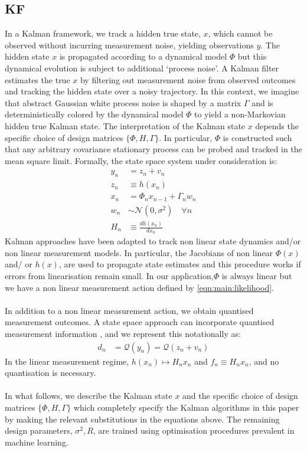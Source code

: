 \subsection{KF}
In a Kalman framework, we track a hidden true state, $x$, which cannot be observed without incurring measurement noise, yielding observations $y$. The hidden state $x$ is propagated according to a dynamical model $\Phi$ but this dynamical evolution is subject to additional `process noise'. A Kalman filter estimates the true $x$ by filtering out measurement noise from observed outcomes and tracking the hidden state over a noisy trajectory. In this context, we imagine that abstract Gaussian white process noise is shaped by  a matrix $\Gamma$ and is deterministically colored by the dynamical model $\Phi$ to yield a non-Markovian hidden true Kalman state. The interpretation of the Kalman state $x$ depends the specific choice of design matrices $\{ \Phi, H, \Gamma\}$. In particular, $\Phi$ is constructed such that any arbitrary covariance stationary process can be probed and tracked in the mean square limit. Formally, the state space system under consideration is:
\begin{align}
y_n &= z_n + v_n \\
z_n & \equiv  h(x_n) \\
x_n & = \Phi_n x_{n-1} + \Gamma_n w_n \label{eqn:KF:dynamics} \\
w_n & \sim \mathcal{N}(0, \sigma^2) \quad \forall n \\
H_n &\equiv \frac{d h(x_n)}{dx_n}  
\end{align}
Kalman approaches have been adapted to track non linear state dynamics and/or non linear measurement models. In particular, the Jacobians of non linear $ \Phi(x)$ and/ or $h(x)$, are used to propagate state estimates and this procedure works if errors from linearisation remain small. In our application,$\Phi$  is always linear but we have a non linear measurement action defined by \cref{eqn:main:likelihood}. 
\\
\\
In addition to a non linear measurement action, we obtain quantised measurement outcomes. A state space approach can incorporate quantised measurement information \cite{karlsson2005}, and we represent this notationally as:
\begin{align}
d_n &= \mathcal{Q}(y_n) = \mathcal{Q}(z_n + v_n)
\end{align}
In the linear measurement regime, $h(x_n) \mapsto H_nx_n$ and $f_n \equiv H_n x_n$, and no quantisation is necessary.
\\
\\
In what follows, we describe the Kalman state $x$ and the specific choice of design matrices $\{ \Phi, H, \Gamma \}$ which completely specify the Kalman algorithms in this paper by making the relevant substitutions in the equations above. The remaining design parameters, $\sigma^2, R$, are trained using optimisation procedures prevalent in machine learning. 

